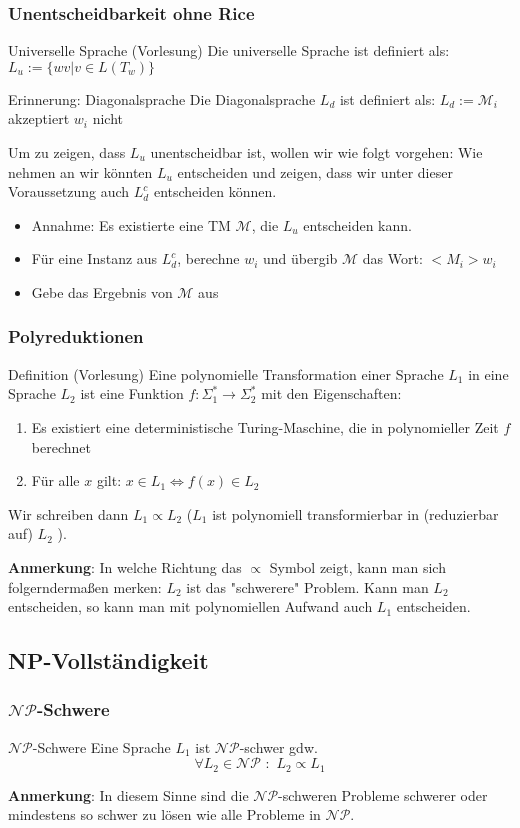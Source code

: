 \documentclass{beamer}
\begin{document}
{\begin{frame}
\frametitle{Unentscheidbarkeit ohne Rice}
\begin{block}{Universelle Sprache (Vorlesung)}
Die universelle Sprache ist definiert als: $L_u := \{wv | v \in L(T_w)\}$
\end{block}
\begin{block}{Erinnerung: Diagonalsprache}
Die Diagonalsprache $L_d$ ist definiert als: $L_d := \mathcal{M}_i$ akzeptiert $w_i$ nicht
\end{block}
Um zu zeigen, dass $L_u$ unentscheidbar ist, wollen wir wie folgt vorgehen: Wie nehmen an wir könnten $L_u$ entscheiden und zeigen, dass wir unter dieser Voraussetzung auch $L_d^c$ entscheiden können.
\begin{itemize}
\item Annahme: Es existierte eine TM $\mathcal{M}$, die $L_u$ entscheiden kann.
\item Für eine Instanz aus $L_d^c$, berechne $w_i$ und übergib $\mathcal{M}$ das Wort: $<M_i>w_i$
\item Gebe das Ergebnis von $\mathcal{M}$ aus
\end{itemize}
\end{frame}

\begin{frame}
\frametitle{Polyreduktionen}
\begin{block}{Definition (Vorlesung)}
Eine polynomielle Transformation einer Sprache $L_1$ in eine Sprache $L_2$ ist eine Funktion
$f: \Sigma^*_1 \rightarrow \Sigma^*_2$ mit den Eigenschaften:
\begin{enumerate}
\item Es existiert eine deterministische Turing-Maschine, die in polynomieller Zeit $f$ berechnet
\item Für alle $x$ gilt: $x \in L_1 \iff f(x) \in  L_2$
\end{enumerate}
Wir schreiben dann $L_1 \propto L_2$ ($L_1$ ist polynomiell transformierbar in (reduzierbar auf) $L_2$ ).
\end{block}
\textbf{Anmerkung}: In welche Richtung das $\propto$ Symbol zeigt, kann man sich folgerndermaßen  merken:
$L_2$ ist das "schwerere" Problem. Kann man $L_2$ entscheiden, so kann man mit polynomiellen Aufwand auch $L_1$ entscheiden.
\end{frame}


\subsection{NP-Vollständigkeit}
\begin{frame}
\frametitle{$\mathcal{NP}$-Schwere}
\begin{block}{$\mathcal{NP}$-Schwere}
Eine Sprache $L_1$ ist $\mathcal{NP}$-schwer gdw. 
\[\forall L_2 \in \mathcal{NP} \,\, : \,\, L_2 \propto L_1\]
\end{block}
\textbf{Anmerkung}: In diesem Sinne sind die $\mathcal{NP}$-schweren Probleme schwerer oder mindestens so schwer zu lösen wie alle Probleme in $\mathcal{NP}$.
\end{frame}

}
\end{document}
